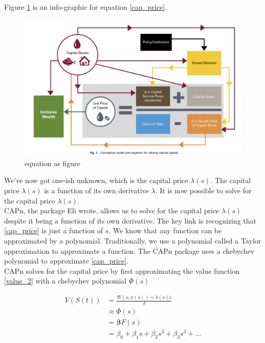 \documentclass{article}
\begin{document}
Figure \ref{price_fig} is an info-graphic for equation \ref{cap_price}.
\begin{figure}[htp]
    \centering
    \includegraphics[width=14cm]{Screen Shot 2023-02-20 at 10.06.29 AM.png}
    \caption{equation as figure}
    \label{price_fig}
\end{figure}


We've now got one-ish unknown, which is the capital price $\lambda(s)$. The capital price $\lambda(s)$ is a function of its own derivative $\dot \lambda$. It is now possible to solve for the capital price $\lambda(s)$.\\

CAPn, the package Eli wrote, allows us to solve for the capital price $\lambda(s)$ despite it being a function of its own derivative. The key link is recognizing that \ref{cap_price} is just a function of $s$. We know that any function can be approximated by a polynomial. Traditionally, we use a polynomial called a Taylor approximation to approximate a function. The CAPn package uses a chebychev polynomial to approximate \ref{cap_price}.\\


CAPn solves for the capital price by first approximating the value function \ref{value_2} with a chebychev polynomial $\Phi(s)$

\begin{align}
    V(S(t)) & = \frac{W(s, x(s)) + \lambda(s) \dot s}{\delta}\\
    & \approx \Phi(s) \\
    & = \mathbf{\beta}F(s)\\
    & = \beta_0 + \beta_1 s + \beta_2 s^2 + \beta_3 s^3 + ...
    \label{chebychev_1}
\end{align}
\end{document}
